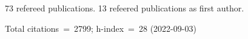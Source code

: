 73 refereed publications. 13 refeered publications as first author.

Total citations~=~2799; h-index~=~28 (2022-09-03)